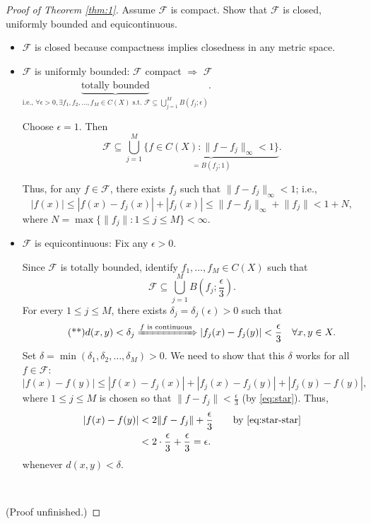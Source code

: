 \documentclass[letterpaper, reqno,11pt]{article}
\begin{document}
\begin{proof}[Proof of Theorem \ref{thm:1}]
  \renewcommand{\qedsymbol}{}
   Assume $\mathcal F$ is compact. Show that $\mathcal F$ is closed, uniformly bounded and equicontinuous.
  \begin{itemize}
  \item $\mathcal F$ is closed because compactness implies closedness in any metric space.
  \item $\mathcal F$ is uniformly bounded: $\mathcal F$ compact $\Rightarrow$ $\mathcal F$ $\underbrace{\text{totally bounded}}_\text{i.e., $\forall \epsilon > 0, \exists f_1, f_2, \ldots, f_M \in C(X) \text{ s.t. } \mathcal F \subseteq \bigcup_{j = 1}^M B(f_j ; \epsilon)$}$.
    
    Choose $\epsilon = 1$. Then
    $$ \mathcal F \subseteq \bigcup_{j = 1}^M \underbrace{\{ f \in C(X) : \lVert f - f_j \rVert_\infty < 1 \}}_{= B(f_j; 1)}. $$

    Thus, for any $f \in \mathcal F$, there exists $f_j$ such that $\lVert f - f_j \rVert_\infty < 1$; i.e.,
    $$ |f(x)| \leq |f(x) - f_j(x)| + |f_j(x)| \leq \lVert f - f_j \rVert_\infty + \lVert f_j \rVert < 1 + N, $$
    where $N = \max \{ \lVert f_j \rVert : 1 \leq j \leq M \} < \infty$.
  \item $\mathcal F$ is equicontinuous: Fix any $\epsilon > 0$.

    Since $\mathcal F$ is totally bounded, identify $f_1, \ldots, f_M \in C(X)$ such that
    \begin{equation} \label{eq:star} \tag{*}
      \mathcal F \subseteq \bigcup_{j = 1}^M B\left(f_j ; \frac{\epsilon}{3}\right).
    \end{equation}
    For every $1 \leq j \leq M$, there exists $\delta_j = \delta_j(\epsilon) > 0$ such that
    \begin{equation} \label{eq:star-star} \tag{**}
      d(x, y) < \delta_j \xRightarrow{\text{$f$ is continuous}} |f_j(x) - f_j(y)|< \frac{\epsilon}{3} \quad \forall x, y \in X.
    \end{equation}
    Set $\delta = \min(\delta_1, \delta_2, \ldots, \delta_M) > 0$. We need to show that this $\delta$ works for all $f \in \mathcal F$:
    $$ |f(x) - f(y)| \leq |f(x) - f_j(x)| + |f_j(x) - f_j(y)| + |f_j(y) - f(y)|, $$
    where $1 \leq j \leq M$ is chosen so that $\lVert f - f_j \rVert < \frac{\epsilon}{3}$ (by \eqref{eq:star}). Thus,
    \begin{align*}
      |f(x) - f(y)| &< 2\lVert f - f_j \rVert + \frac{\epsilon}{3} \qquad \text{by \eqref{eq:star-star}} \\
      &< 2 \cdot \frac{\epsilon}{3} + \frac{\epsilon}{3} = \epsilon.
    \end{align*}
    whenever $d(x, y) < \delta$.
  \end{itemize}

  ~

  (Proof unfinished.)
\end{proof}
\end{document}
